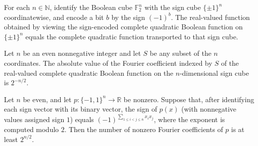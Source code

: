 \begin{theorem}
\label{FABL.completeQuadraticBoolean_toReal}
\leanok
{}
For each $n\in\mathbb{N}$, identify the Boolean cube $\mathbb{F}_2^n$ with the sign cube
$\{\pm1\}^n$ coordinatewise, and encode a bit $b$ by the sign $(-1)^b$. The real-valued
function obtained by viewing the sign-encoded complete quadratic Boolean function on
$\{\pm1\}^n$ equals the complete quadratic function transported to that sign cube.
\end{theorem}

\begin{theorem}
\label{FABL.abs_fourierCoeff_completeQuadraticBoolean}
\leanok
{}
Let $n$ be an even nonnegative integer and let $S$ be any subset of the $n$ coordinates.
The absolute value of the Fourier coefficient indexed by $S$ of the real-valued complete
quadratic Boolean function on the $n$-dimensional sign cube is $2^{-n/2}$.
\end{theorem}

\begin{theorem}
\label{FABL.pow_two_half_le_polynomialSparsity_completeQuadraticBoolean}
\leanok
{}
Let $n$ be even, and let $p:\{-1,1\}^n\to\mathbb R$ be nonzero. Suppose that, after
identifying each sign vector with its binary vector, the sign of $p(x)$ (with
nonnegative values assigned sign $1$) equals $(-1)^{\sum_{1\le i<j\le n}x_i x_j}$, where
the exponent is computed modulo $2$. Then the number of nonzero Fourier coefficients of
$p$ is at least $2^{n/2}$.
\end{theorem}

